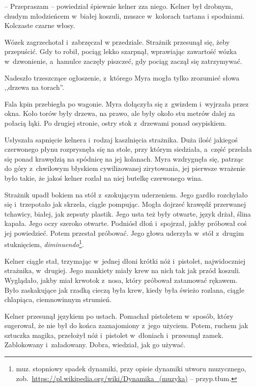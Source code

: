 \documentclass[oneside,polish,11pt,sfheadings]{mwbk}
\begin{document}
-- Przepraszam -- powiedział śpiewnie kelner zza niego. Kelner był
drobnym, chudym młodzieńcem w~białej koszuli, muszce w~kolorach tartana
i spodniami. Kolczaste czarne włosy.

Wózek zagrzechotał i~zabrzęczał w przedziale. Strażnik przesunął się,
żeby przepuścić. Gdy to robił, pociąg lekko szarpnął, wprawiając
zawartość wózka w~dzwonienie, a~hamulce zaczęły piszczeć, gdy pociąg
zaczął się zatrzymywać.

Nadeszło trzeszczące ogłoszenie, z~którego Myra mogła tylko zrozumieć
słowa ,,drzewa na torach''.

Fala kpin przebiegła po wagonie. Myra dołączyła się z~gwizdem i~wyjrzała
przez okna. Koło torów były drzewa, na prawo, ale były około stu metrów
dalej za połacią łąki. Po drugiej stronie, ostry stok z~drzewami ponad
osypiskiem.

Usłyszała sapnięcie kelnera i~rodzaj kaszlnięcia strażnika. Duża ilość
jakiegoś czerwonego płynu rozprysnęła się na stole, przy którym
siedziała, a~część przelała się ponad krawędzią na spódnicę na jej
kolanach. Myra wzdrygnęła się, patrząc do góry z~chwilowym błyskiem
cywilizowanej zirytowania, jej pierwsze wrażenie było takie, że jakoś
kelner rozlał na niej butelkę czerwonego wina.

Strażnik upadł bokiem na stół z~szokującym uderzeniem. Jego gardło
rozchylało się i~trzepotało jak skrzela, ciągle pompując. Mogła dojrzeć
krawędź przerwanej tchawicy, białej, jak zepsuty plastik. Jego usta też
były otwarte, język drżał, ślina kapała. Jego oczy szeroko otwarte.
Podniósł dłoń i~spojrzał, jakby próbował coś jej powiedzieć. Potem
przestał próbować. Jego głowa uderzyła w~stół z~drugim stuknięciem,
\textit{diminuendo}\footnote{muz. stopniowy spadek dynamiki, przy opisie
dynamiki utworu muzycznego,
zob.~\url{https://pl.wikipedia.org/wiki/Dynamika\_(muzyka)} -- przyp.tłum.}.

Kelner ciągle stał, trzymając w~jednej dłoni krótki nóż i~pistolet,
najwidoczniej strażnika, w~drugiej. Jego mankiety miały krew na nich tak
jak przód koszuli. Wyglądało, jakby miał krwotok z~nosa, który próbował
zatamować rękawem. Było zaskakujące jak rzadką cieczą była krew, kiedy
była świeżo rozlana, ciągle chlapiąca, ciemnowinnym strumień.

Kelner przesunął językiem po ustach. Pomachał pistoletem w~sposób, który
sugerował, że nie był do końca zaznajomiony z~jego użyciem. Potem,
ruchem jak sztuczka magika, przełożył nóż i~pistolet w~dłoniach i~przesunął zamek. Zablokowany i~załadowany. Dobra, wiedział, jak go
używać.
\end{document}
